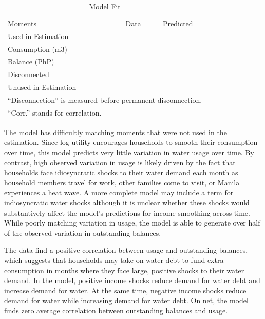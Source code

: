 \documentclass[12pt]{article}
\begin{document}
\begin{table}[H]
\centering
\caption{Model Fit}\label{table:fit}

\begin{tabular}{l*{1}{cc}}
\toprule
 Moments & Data  & Predicted \\[.5em]
Used in Estimation & & \\
Consumption (m3) & & \\
Balance (PhP) & & \\
Disconnected &&  \\[.4em]
Unused in Estimation & & \\


\bottomrule
\multicolumn{3}{l}{\scriptsize ``Disconnection'' is measured before permanent disconnection. }  \\[-.5em]
\multicolumn{3}{l}{\scriptsize ``Corr.'' stands for correlation.   }  \\[-.5em]
\end{tabular}
%
\end{table}

The model has difficultly matching moments that were not used in the estimation.  Since log-utility encourages households to smooth their consumption over time, this model predicts very little variation in water usage over time.  By contrast, high observed variation in usage is likely driven by the fact that households face idiosyncratic shocks to their water demand each month as household members travel for work, other families come to visit, or Manila experiences a heat wave.  A more complete model may include a term for indiosyncratic water shocks although it is unclear whether these shocks would substantively affect the model's predictions for income smoothing across time.  While poorly matching variation in usage, the model is able to generate over half of the observed variation in outstanding balances.  

The data find a positive correlation between usage and outstanding balances, which suggests that households may take on water debt to fund extra consumption in months where they face large, positive shocks to their water demand.  In the model, positive income shocks reduce demand for water debt and increase demand for water. At the same time, negative income shocks reduce demand for water while increasing demand for water debt.  On net, the model finds zero average correlation between outstanding balances and usage. %
\end{document}
